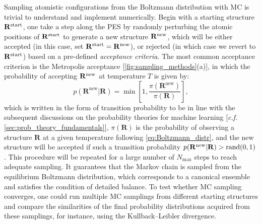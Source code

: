 
Sampling atomistic configurations from the Boltzmann distribution with MC is trivial to understand and implement numerically. Begin with a starting structure $\mathbf{R}^{\mbox{\scriptsize{start}}}$, one take a step along the PES by randomly perturbing the atomic positions of $\mathbf{R}^{\mbox{\scriptsize{start}}}$ to generate a new structure $\mathbf{R}^{\mbox{\scriptsize{new}}}$, which will be either accepted (in this case, set $\mathbf{R}^{\mbox{\scriptsize{start}}}=\mathbf{R}^{\mbox{\scriptsize{new}}}$), or rejected (in which case we revert to $\mathbf{R}^{\mbox{\scriptsize{start}}}$) based on a pre-defined \emph{acceptance criteria}. The most common acceptance criterion is the Metropolis acceptance\cite{metropolis1953equation} [\cref{fig:sampling_methods}(a)], in which the probability of accepting $\mathbf{R}^{\mbox{\scriptsize{new}}}$ at temperature $T$ is given by:
\begin{equation}
    \label{eq:metropolis}
    p(\bm{R}^{\mathrm{new}}|\bm{R})=\min\left[1,\frac{\pi(\bm{R}^{\mathrm{new}})}{\pi(\bm{R})}\right],
\end{equation}
which is written in the form of transition probability to be in line with the subsequent discussions on the probability theories for machine learning [\emph{c.f.} \cref{sec:prob_theory_fundamentals}], $\pi(\bm{R})$ is the probability of observing a structure $\bm{R}$ at a given temperature following \cref{eq:Boltzmann_distr},
and the new structure will be accepted if such a transition probability $p(\mathbf{R^{\mbox{\scriptsize{new}}}}|\mathbf{R})>\mbox{rand}(0,1)$. 
This procedure will be repeated for a large number of $N_{\max}$ steps to reach adequate sampling. It guarantees that the Markov chain is sampled from the equilibrium Boltzmann distribution, which corresponds to a canonical ensemble and satisfies the condition of detailed balance. To test whether MC sampling converges, one could run multiple MC samplings from different starting structures and compare the similarities of the final probability distributions acquired from these samplings, for instance, using the Kullback–Leibler divergence.\cite{kullback1951information} 

